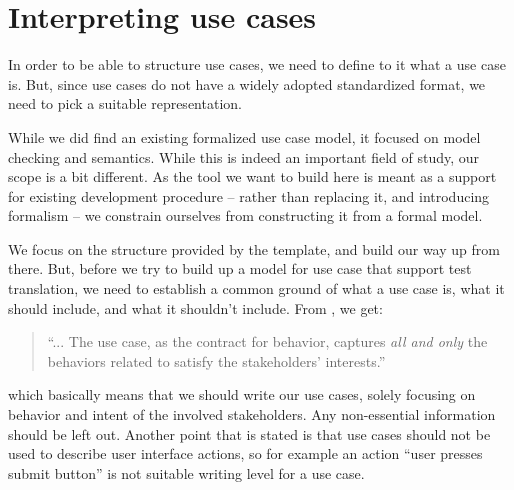 \section{Interpreting use cases}
In order to be able to structure use cases, we need to define to it what a use case is. But, since use cases do not have a widely adopted standardized format, we need to pick a suitable representation.\medskip

\noindent While we did find an existing formalized use case model\cite{klimek2010formal}, it focused on model checking and semantics. While this is indeed an important field of study, our scope is a bit different. As the tool we want to build here is meant as a support for existing development procedure -- rather than replacing it, and introducing formalism -- we constrain ourselves from constructing it from a formal model.\medskip

\noindent We focus on the structure provided by the template, and build our way up from there. But, before we try to build up a model for use case that support test translation, we need to establish a common ground of what a use case is, what it should include, and what it shouldn't include. From \cite{cockburn2000}, we get:
\begin{quote}
``... The use case, as the contract for behavior, captures \emph{all and only} the behaviors related to satisfy the stakeholders’ interests.''
\end{quote}which basically means that we should write our use cases, solely focusing on behavior and intent of the involved stakeholders. Any non-essential information should be left out. Another point that is stated\cite{larman2005} is that use cases should not be used to describe user interface actions, so for example an action ``user presses submit button'' is not suitable writing level for a use case.\medskip

